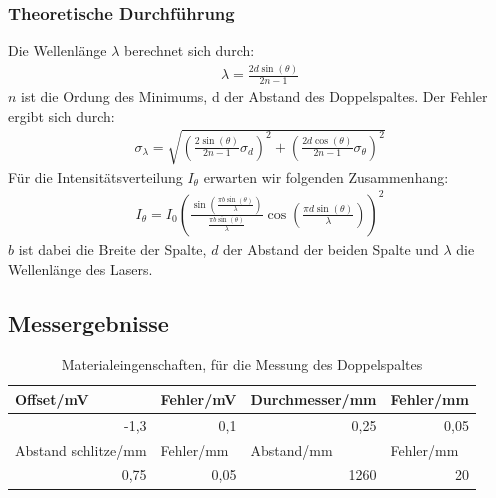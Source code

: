 \documentclass[12pt]{scrartcl}
\begin{document}
\subsubsection{Theoretische Durchführung}
Die Wellenlänge $\lambda$ berechnet sich durch:
\begin{align}
\lambda = \frac{2d \sin(\theta)}{2n-1}
\label{eqn:lambda_2}
\end{align}
$n$ ist die Ordung des Minimums, d der Abstand des Doppelspaltes.
Der Fehler ergibt sich durch:
\begin{align}
\sigma_\lambda = \sqrt{
\left(\frac{2 \sin(\theta)}{2n-1}\sigma_d\right)^2+
\left(\frac{2d \cos(\theta)}{2n-1}\sigma_\theta\right)^2}
\label{eqn:lambda_2_sigma}
\end{align}
Für die Intensitätsverteilung $I_\theta$ erwarten wir folgenden Zusammenhang:
\begin{align}
I_\theta = I_0\left(\frac{\sin\left(\frac{\pi b \sin(\theta)}{\lambda}\right)}{\frac{\pi b \sin(\theta)}{\lambda}}\cos\left(\frac{\pi d\sin(\theta)}{\lambda}\right)\right)^2
\label{eqn:I_theta_Doppelspalt}
\end{align}
$b$ ist dabei die Breite der Spalte, $d$ der Abstand der beiden Spalte und $\lambda$ die Wellenlänge des Lasers.

\subsection{Messergebnisse}

\begin{table}[H]
\caption{Materialeingenschaften, für die Messung des Doppelspaltes}
\begin{center}
\begin{tabular}{|l|l|l|l|}
\hline
Offset/mV & Fehler/mV & Durchmesser/mm & Fehler/mm \\ \hline
\multicolumn{1}{|r|}{-1,3} & \multicolumn{1}{|r|}{0,1} & \multicolumn{1}{r|}{0,25} & \multicolumn{1}{r|}{0,05} \\ \hline
Abstand schlitze/mm & Fehler/mm & Abstand/mm & Fehler/mm \\ \hline
\multicolumn{1}{|r|}{0,75} & \multicolumn{1}{r|}{0,05} & \multicolumn{1}{r|}{1260} & \multicolumn{1}{r|}{20} \\ \hline
\end{tabular}
\end{center}
\label{tab:a_3_e}
\end{table}
\end{document}
